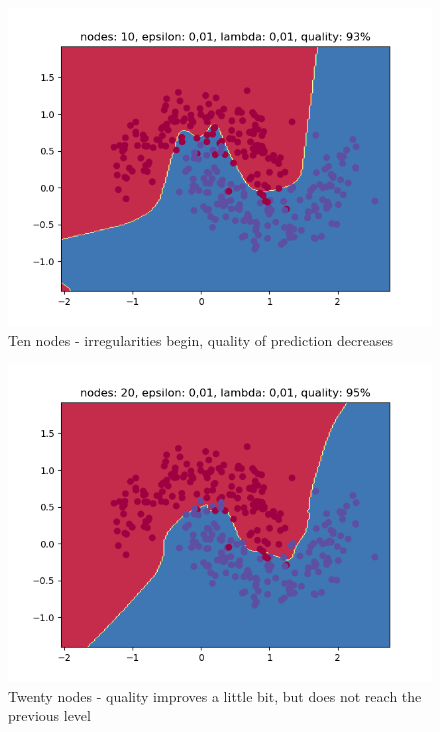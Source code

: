 \documentclass[3p,twocolumn]{elsarticle}
\begin{document}
\begin{figure}[h]
\label{fig:fig5}
  \includegraphics[width=\linewidth]{wykresy/19.png}
	\caption{ Ten nodes - irregularities begin, quality of prediction decreases}
	\label{fig5}
\end{figure}

\begin{figure}[h]
\label{fig:fig5}
  \includegraphics[width=\linewidth]{wykresy/20.png}
	\caption{ Twenty nodes - quality improves a little bit, but does not reach the previous level}
	\label{fig5}
\end{figure}
\end{document}

